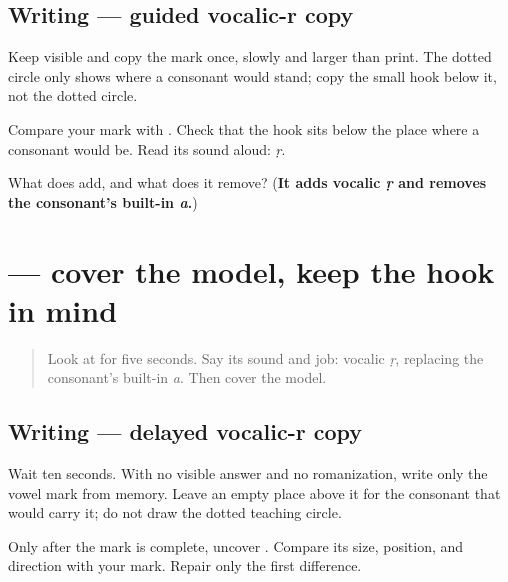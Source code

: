 \subsection*{Writing — guided vocalic-r copy}

Keep \textbf{} visible and copy the mark once, slowly and larger than print. The dotted circle only shows where a consonant would stand; copy the small hook below it, not the dotted circle.

Compare your mark with \textbf{}. Check that the hook sits below the place where a consonant would be. Read its sound aloud: \emph{ṛ}.

\begin{tcolorbox}[breakable,colback=teal!4,colframe=teal!35!black,title={Before you move on}]
What does \textbf{} add, and what does it remove? (\textbf{It adds vocalic \emph{ṛ} and removes the consonant's built-in \emph{a}.})
\end{tcolorbox}
\section[\texorpdfstring{\sk{ृ} (ṛ)}{ृ (ṛ)}]{ — cover the model, keep the hook in mind}

\label{lesson:SA-W05-vocalic-r-delayed-copy}



\begin{quote}
Look at \textbf{} for five seconds. Say its sound and job: vocalic \emph{ṛ}, replacing the consonant's built-in \emph{a}. Then cover the model.
\end{quote}

\subsection*{Writing — delayed vocalic-r copy}

Wait ten seconds. With no visible answer and no romanization, write only the vowel mark from memory. Leave an empty place above it for the consonant that would carry it; do not draw the dotted teaching circle.

Only after the mark is complete, uncover \textbf{}. Compare its size, position, and direction with your mark. Repair only the first difference.

